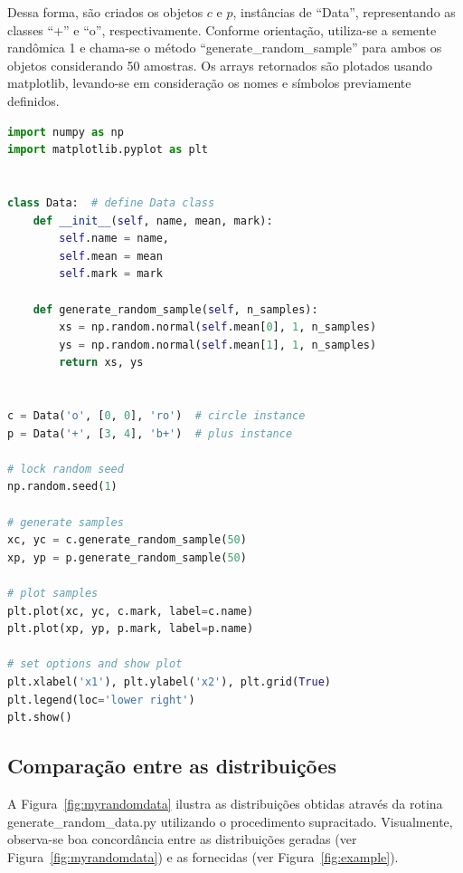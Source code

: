 \documentclass[12pt, a4paper]{mycoursepaper}
\begin{document}
Dessa forma, são criados os objetos $c$ e $p$, instâncias de ``Data'', representando as classes ``+'' e ``o'', respectivamente. Conforme orientação, utiliza-se a semente randômica 1 e chama-se o método ``generate\_random\_sample'' para ambos os objetos considerando 50 amostras. Os arrays retornados são plotados usando matplotlib, levando-se em consideração os nomes e símbolos previamente definidos.

% 
\begin{lstlisting}[language=Python, caption=Rotina em Python3: generate\_random\_data.py, label=lst:grd]
import numpy as np
import matplotlib.pyplot as plt


class Data:  # define Data class
    def __init__(self, name, mean, mark):
        self.name = name,
        self.mean = mean
        self.mark = mark

    def generate_random_sample(self, n_samples):
        xs = np.random.normal(self.mean[0], 1, n_samples)
        ys = np.random.normal(self.mean[1], 1, n_samples)
        return xs, ys


c = Data('o', [0, 0], 'ro')  # circle instance
p = Data('+', [3, 4], 'b+')  # plus instance

# lock random seed
np.random.seed(1)

# generate samples
xc, yc = c.generate_random_sample(50)
xp, yp = p.generate_random_sample(50)

# plot samples
plt.plot(xc, yc, c.mark, label=c.name)
plt.plot(xp, yp, p.mark, label=p.name)

# set options and show plot
plt.xlabel('x1'), plt.ylabel('x2'), plt.grid(True)
plt.legend(loc='lower right')
plt.show()
\end{lstlisting}

\newpage
\subsection{Comparação entre as distribuições}

A Figura~\ref{fig:myrandomdata} ilustra as distribuições obtidas através da rotina generate\_random\_data.py utilizando o procedimento supracitado. Visualmente, observa-se boa concordância entre as distribuições geradas (ver Figura~\ref{fig:myrandomdata}) e as fornecidas (ver Figura~\ref{fig:example}).
\end{document}
